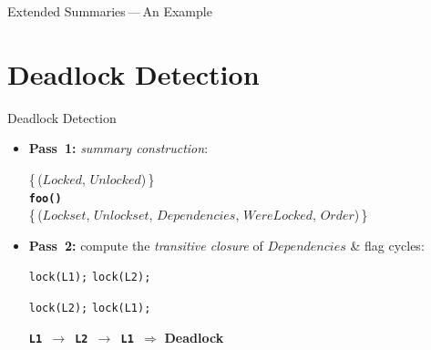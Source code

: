 \documentclass[10pt, xcolor=pdflatex, hyperref={unicode}, aspectratio=169]{beamer}
\newcommand\tab[1][1cm]{\hspace*{#1}}
\begin{document}
\begin{frame}{Extended Summaries\,---\,An Example}
\end{frame}




\section{Deadlock Detection}
\begin{frame}{Deadlock Detection}
    \begin{itemize}\setlength\itemsep{3em}
        \item \textbf{Pass~1:} \emph{summary construction}: \\
            \vspace{.5em}
            \begin{center}
                \{\,($ Locked $, $ Unlocked $)\,\} \\
                \textbf{\texttt{foo()}} \\
                \{\,($ Lockset $, $ Unlockset $, \alert{$ Dependencies $}, $ WereLocked $, $ Order $)\,\}
            \end{center}

        \item \textbf{Pass~2:} compute the \emph{transitive closure} of \alert{$ Dependencies $} \& flag cycles: \\
            \vspace{.5em}

            \textcolor{thread1}{\texttt{lock(L1);}\tab\tab[1.2cm] \textcolor{thread2}{\texttt{lock(L2);}}}

            \textcolor{thread2}{\texttt{lock(L2);}\tab\tab[1.2cm] \textcolor{thread1}{\texttt{lock(L1);}}}

            \vspace{1em}

            \texttt{\textbf{\textcolor{thread1}{L1}} $ \rightarrow $ \textbf{\textcolor{thread2}{L2}} $ \rightarrow $ \textbf{\textcolor{thread1}{L1}} $ \Rightarrow $} \textbf{\alert{Deadlock}}
    \end{itemize}
\end{frame}
\end{document}
